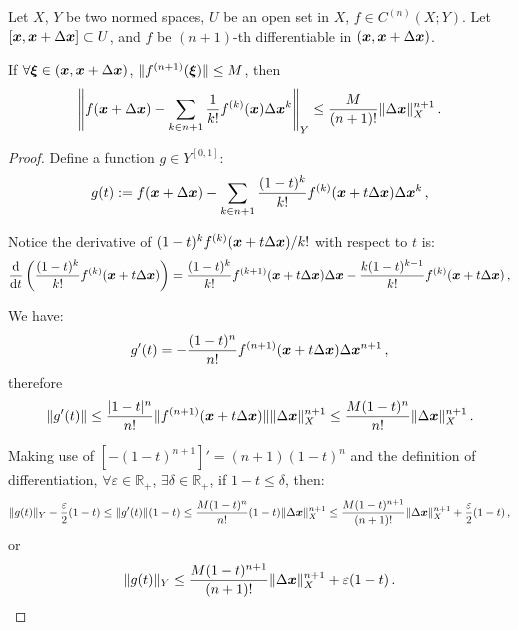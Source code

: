 \documentclass[openany]{book}
\begin{document}
\begin{theorem}
	Let $X$, $Y$ be two normed spaces, $U$ be an open set in $X$, $f \in C^{(n)}(X; Y)$. 
	Let $[\boldsymbol{x}, \boldsymbol{x} + \Delta \boldsymbol{x}] \subset U$, and $f$ be $(n + 1)$-th differentiable in $(\boldsymbol{x}, \boldsymbol{x} + \Delta \boldsymbol{x})$.

	If $\forall \boldsymbol{\xi} \in (\boldsymbol{x}, \boldsymbol{x} + \Delta \boldsymbol{x})$, $\|f^{(n+1)}(\boldsymbol{\xi})\| \leq M$,
	then 
	\begin{equation*}
		\left\|
			f(\boldsymbol{x} + \Delta \boldsymbol{x}) - \sum_{k \in n + 1} \frac{1}{k!} f^{(k)}(\boldsymbol{x}) \Delta \boldsymbol{x}^k
		\right\|_Y \leq \frac{M}{(n + 1)!}\|\Delta \boldsymbol{x}\|_X^{n + 1}\,.
	\end{equation*}
\end{theorem}
\begin{proof}
	Define a function $g \in Y^{[0, 1]}$:
	\begin{equation*}
		g(t) := f(\boldsymbol{x} + \Delta \boldsymbol{x}) - \sum_{k \in n + 1} \frac{(1 - t)^k}{k!} f^{(k)}(\boldsymbol{x} + t \Delta \boldsymbol{x}) \Delta \boldsymbol{x}^k\,,
	\end{equation*}

	Notice the derivative of $(1-t)^k f^{(k)}(\boldsymbol{x} + t \Delta \boldsymbol{x}) / k!$ with respect to $t$ is:
	\begin{equation*}
		\diff{}{t} \left( 
			\frac{(1 - t)^k}{k!} f^{(k)}(\bv x + t \Delta \bv x)  
		 \right)
		= \frac{(1 - t)^k}{k!} f^{(k + 1)}(\bv x + t \Delta \bv x) \Delta \bv x 
		- \frac{k(1 - t)^{k-1}}{k!} f^{(k)}(\bv x + t \Delta \bv x) \,,
	\end{equation*}

	We have:
	\begin{equation*}
		g'(t) = - \frac{(1 - t)^n}{n!} f^{(n + 1)}(\boldsymbol{x} + t \Delta \boldsymbol{x}) \Delta \boldsymbol{x}^{n + 1}\,,
	\end{equation*}
	therefore
	\begin{equation*}
		\|g'(t)\| 
		\leq \frac{|1-t|^n}{n!} \|f^{(n + 1)}(\boldsymbol{x} + t \Delta \boldsymbol{x})\| \| \Delta \boldsymbol{x}\|_X^{n + 1}
		\leq \frac{M (1-t)^n}{n!} \|\Delta \boldsymbol{x}\|_X^{n+1}\,.
	\end{equation*}

	Making use of $[- (1-t)^{n + 1}]' = (n + 1) (1 - t)^n$ and the definition of differentiation, $\forall \varepsilon \in \mathbb R_+$, $\exists \delta \in \mathbb R_+$, if $1 - t \leq \delta$, then:
	\begin{equation*}
		\|g(t)\|_Y - \frac{\varepsilon}{2}(1 - t) \leq \|g'(t)\|(1 - t) 
		\leq  \frac{M (1-t)^n}{n!} (1 - t) \|\Delta \boldsymbol{x}\|_X^{n+1}
		\leq \frac{M (1-t)^{n + 1}}{(n + 1)!} \|\Delta \boldsymbol{x}\|_X^{n+1} + \frac{\varepsilon}{2}(1 - t)\,,
	\end{equation*}
	or
	\begin{equation*}
		\|g(t)\|_Y \leq \frac{M (1-t)^{n + 1}}{(n + 1)!} \|\Delta \boldsymbol{x}\|_X^{n+1} + \varepsilon (1 - t)\,.
	\end{equation*}
	

\end{proof}
\end{document}
